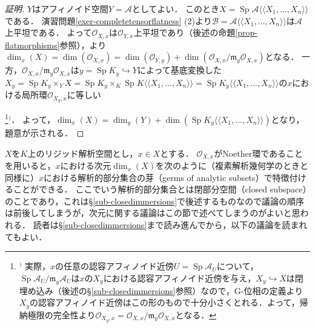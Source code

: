 \documentclass[a4paper,12pt, dvipdfmx]{jsbook}
\def\O{\mathscr{O}}
\def\m{\mathfrak{m}}
\def\Sp{\mathop{\mathrm{Sp}}\nolimits}
\def\dl{\langle\!\langle}
\def\dr{\rangle\!\rangle}
\theoremstyle{plain}
\theoremstyle{definition}
\newcounter{chushaku}
\def\chu#1{\addtocounter{chushaku}{1}\footnote[\value{chushaku}]{${}^)$ #1}${}^)$}
\begin{document}
\begin{proof}[証明]
$Y$はアフィノイド空間$Y=\mathcal{A}$としてよい．
このとき$X=\Sp\mathcal{A}\dl X_1,\ldots,X_n\dr$である．
演習問題\ref{exer-completetensorflatness} (2)より$\mathcal{B}=\mathcal{A}\dl X_1,\ldots,X_n\dr$は$\mathcal{A}$上平坦である．
よって$\O_{X,x}$は$\O_{Y,x}$上平坦であり（後述の命題\ref{prop-flatmorphisms}参照），\cite[Theorem 15.1]{Matsu}より$\dim_x(X)=\dim(\O_{X,x})=\dim(\O_{Y,y})+\dim(\O_{X,x}/\m_y\O_{X,x})$となる．
一方，$\O_{X,x}/\m_y\O_{X,x}$は$y=\Sp K_y\hookrightarrow Y$によって基底変換した$X_y=\Sp K_y\times_YX=\Sp K_y\times_K\Sp K\dl X_1,\ldots,X_n\dr=\Sp K_y\dl X_1,\ldots,X_n\dr$の$x$における局所環$\O_{X_y,x}$に等しい\chu{実際，$x$の任意の認容アフィノイド近傍$U=\Sp\mathcal{A}_U$について，$\Sp\mathcal{A}_U/\m_y\mathcal{A}_U$は$x$の$X_y$における認容アフィノイド近傍を与え，$X_y\hookrightarrow X$は閉埋め込み（後述の\S\ref{sub-closedimmersions}参照）なので，G-位相の定義より$X_y$の認容アフィノイド近傍はこの形のもので十分小さくとれる．よって，帰納極限の完全性より$\O_{X_y,x}=\O_{X,x}/\m_y\O_{X,x}$となる．}．
よって，$\dim_x(X)=\dim_y(Y)+\dim(\Sp K_y\dl X_1,\ldots,X_n\dr)$となり，題意が示される．
\end{proof}

$X$を$K$上のリジッド解析空間とし，$x\in X$とする．
$\O_{X,x}$がNoether環であることを用いると，$x$における次元$\dim_x(X)$を次のように（複素解析幾何学のときと同様に）$x$における解析的部分集合の芽（germs of analytic subsets）で特徴付けることができる．
ここでいう解析的部分集合とは閉部分空間（closed subspace）のことであり，これは\S\ref{sub-closedimmersions}で後述するものなので議論の順序は前後してしまうが，次元に関する議論はこの節で述べてしまうのがよいと思われる．
読者は\S\ref{sub-closedimmersions}まで読み進んでから，以下の議論を読まれてもよい．
\end{document}
